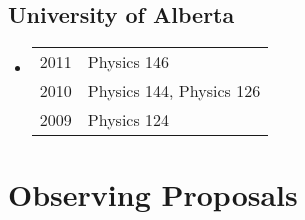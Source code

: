 \subsection*{University of Alberta}
\begin{itemize}
\item \begin{tabular}{ll}
2011 & Physics 146 \\
2010 & Physics 144, Physics 126 \\
2009 & Physics 124 \\
\end{tabular}
\end{itemize}


\section*{Observing Proposals}
